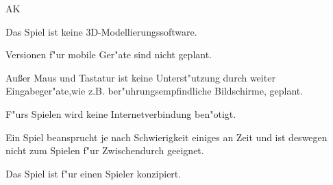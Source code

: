 \begin{ids}{\gls{AK}}

	\id[10] Das Spiel ist keine 3D-Modellierungssoftware.
	
	\id[20] Versionen f{"u}r mobile Ger{"a}te sind nicht geplant.
	
	\id[20] Außer Maus und Tastatur ist keine Unterst{"u}tzung durch weiter Eingabeger{"a}te,wie z.B.  ber{"u}hrungsempfindliche Bildschirme, geplant.
	
	\id[40]F{"u}rs Spielen wird keine Internetverbindung ben{"o}tigt. 
	
	\id[50] Ein Spiel beansprucht je nach Schwierigkeit einiges an Zeit und ist deswegen nicht zum Spielen f{"u}r Zwischendurch geeignet.
	
	\id[60] Das Spiel ist f{"u}r einen Spieler konzipiert.
	
\end{ids}


